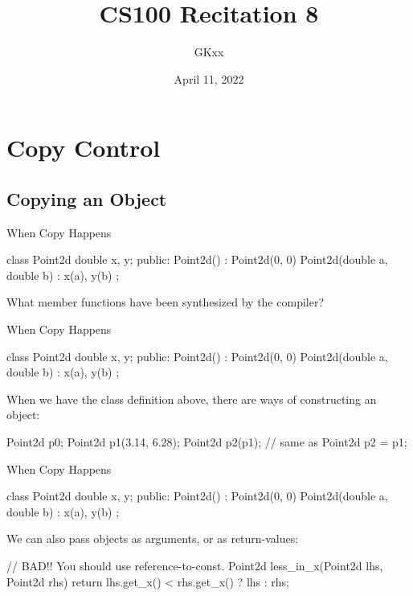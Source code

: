 \documentclass{beamer}
\title{CS100 Recitation 8}
\author{GKxx}
\date{April 11, 2022}
\begin{document}
\begin{frame}
    \maketitle
\end{frame}

\section{Copy Control}

\subsection{Copying an Object}

\begin{frame}[fragile]{When Copy Happens}
    \begin{cpp}
class Point2d {
  double x, y;
 public:
  Point2d() : Point2d(0, 0) {}
  Point2d(double a, double b) : x(a), y(b) {}
};
    \end{cpp}
    \begin{question}
        What member functions have been synthesized by the compiler?
    \end{question}
\end{frame}

\begin{frame}[fragile]{When Copy Happens}
    \begin{cpp}
class Point2d {
  double x, y;
 public:
  Point2d() : Point2d(0, 0) {}
  Point2d(double a, double b) : x(a), y(b) {}
};
    \end{cpp}
    When we have the class definition above, there are  ways of constructing an object:
    \begin{cpp}
Point2d p0;
Point2d p1(3.14, 6.28);
Point2d p2(p1); // same as Point2d p2 = p1;
    \end{cpp}
\end{frame}

\begin{frame}[fragile]{When Copy Happens}
    \begin{cpp}
class Point2d {
  double x, y;
 public:
  Point2d() : Point2d(0, 0) {}
  Point2d(double a, double b) : x(a), y(b) {}
};
    \end{cpp}
    We can also pass  objects as arguments, or as return-values:
    \begin{cpp}
// BAD!! You should use reference-to-const.
Point2d less_in_x(Point2d lhs, Point2d rhs) {
  return lhs.get_x() < rhs.get_x() ? lhs : rhs;
}
    \end{cpp}
\end{frame}
\end{document}
